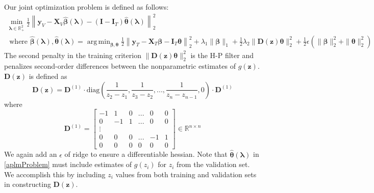 \documentclass[10pt,letterpaper]{article}
\DeclareMathOperator*{\argmin}{arg\,min}
\begin{document}
Our joint optimization problem is defined as follows:
\begin{equation}
\begin{array}{c}
\min_{\boldsymbol\lambda \in \mathbb{R}^2_{+}} \frac{1}{2}
\left \|
\boldsymbol{y}_V
- \boldsymbol{X}_V\hat{\boldsymbol{\beta}}(\boldsymbol{\lambda})
- (\boldsymbol{I} - \boldsymbol{I}_T) \hat{\boldsymbol{\theta}}(\boldsymbol{\lambda})
\right \|^2_2 \\
\text{ where }
\hat{\boldsymbol{\beta}}(\boldsymbol{\lambda}),
\hat{\boldsymbol{\theta}}(\boldsymbol{\lambda}) =
\argmin_{\boldsymbol{\beta}, \boldsymbol{\theta}}
\frac{1}{2} \left \|
\boldsymbol{y}_T
- \boldsymbol{X}_T\boldsymbol{\beta}
- \boldsymbol{I}_T \boldsymbol{\theta} \right \|^2_2
+ \lambda_1 \| \boldsymbol{\beta} \|_1
+ \frac{1}{2} \lambda_2 \| \boldsymbol{D}(\boldsymbol{z}) \boldsymbol{\theta} \|_2^2
+ \frac{1}{2} \epsilon \left( \| \boldsymbol{\beta} \|_2^2 + \| \boldsymbol{\theta} \|_2^2 \right )
\end{array}
\label{aplmProblem}
\end{equation}
The second penalty in the training criterion $\| \boldsymbol{D}(\boldsymbol{z}) \boldsymbol{\theta} \|_2^2$ is the H-P filter and penalizes second-order differences between the nonparametric estimates of $g(\boldsymbol{z})$. $\boldsymbol{D}(\boldsymbol{z})$ is defined as
\begin{equation}
\boldsymbol{D}(\boldsymbol{z}) = \boldsymbol{D}^{(1)} \cdot
\text{diag} \left ( \frac{1}{z_{2} - z_1}, \frac{1}{z_{3} - z_2}, ... , \frac{1}{z_{n} - z_{n-1}}, 0 \right )
\cdot \boldsymbol{D}^{(1)}
\end{equation}
where
\begin{equation}
\boldsymbol{D}^{(1)} = 
\begin{bmatrix}
-1 & 1 & 0 & ... & 0 & 0 \\
0 & -1 & 1 & ... & 0 & 0 \\
\vdots \\
0 & 0 & 0 & ... & -1 & 1 \\
0 &0 & 0 &  0  &  0 & 0
\end{bmatrix}
\in
\mathbb{R}^{n\times n}
\end{equation}
We again add an $\epsilon$ of ridge to ensure a differentiable hessian. Note that $\hat{\boldsymbol{\theta}}(\boldsymbol{\lambda})$ in \eqref{aplmProblem} must include estimates of $g(z_i)$ for  $z_i$ from the validation set. We accomplish this by including $z_i$ values from both training and validation sets in constructing $\boldsymbol{D}(\boldsymbol{z})$.
\end{document}
